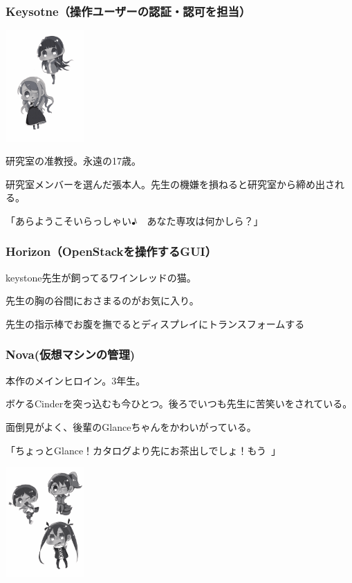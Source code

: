 \documentclass[8pt,b5paper,tombo,openany]{jsbook}
\begin{document}
\subsubsection{Keysotne（操作ユーザーの認証・認可を担当）}

\begin{floatingfigure}[r]{3cm}
  \includegraphics[width=3cm]{./img/char1.pdf}
\end{floatingfigure}

研究室の准教授。永遠の17歳。

研究室メンバーを選んだ張本人。先生の機嫌を損ねると研究室から締め出される。

「あらようこそいらっしゃい♪　あなた専攻は何かしら？」

\subsubsection{Horizon（OpenStackを操作するGUI）}

keystone先生が飼ってるワインレッドの猫。

先生の胸の谷間におさまるのがお気に入り。

先生の指示棒でお腹を撫でるとディスプレイにトランスフォームする

\subsubsection{Nova(仮想マシンの管理)}

本作のメインヒロイン。3年生。

ボケるCinderを突っ込むも今ひとつ。後ろでいつも先生に苦笑いをされている。

面倒見がよく、後輩のGlanceちゃんをかわいがっている。

「ちょっとGlance！カタログより先にお茶出しでしょ！もう~」

\begin{floatingfigure}[r]{3cm}
  \includegraphics[width=3cm]{./img/char2.pdf}
\end{floatingfigure}
\end{document}
